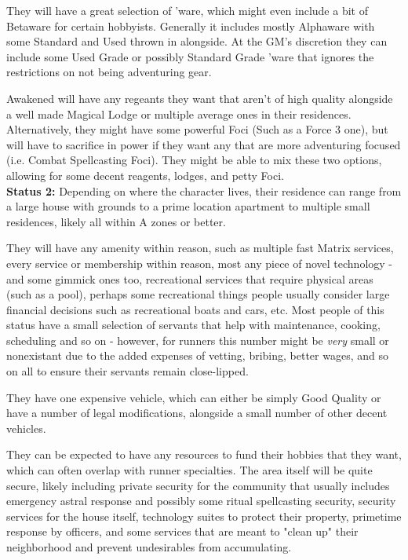 \begin{multicols}{2}
\begin{coloredbox}
	They will have a great selection of 'ware, which might even include a bit of Betaware for certain hobbyists. Generally it includes mostly Alphaware with some Standard and Used thrown in alongside. At the GM's discretion they can include some Used Grade or possibly Standard Grade 'ware that ignores the restrictions on not being adventuring gear.
	
	Awakened will have any regeants they want that aren't of high quality alongside a well made Magical Lodge or multiple average ones in their residences. Alternatively, they might have some powerful Foci (Such as a Force 3 one), but will have to sacrifice in power if they want any that are more adventuring focused (i.e. Combat Spellcasting Foci). They might be able to mix these two options, allowing for some decent reagents, lodges, and petty Foci. \\
	
	\textbf{Status 2:} Depending on where the character lives, their residence can range from a large house with grounds to a prime location apartment to multiple small residences, likely all within A zones or better.
	
	They will have any amenity within reason, such as multiple fast Matrix services, every service or membership within reason, most any piece of novel technology - and some gimmick ones too, recreational services that require physical areas (such as a pool), perhaps some recreational things people usually consider large financial decisions such as recreational boats and cars, etc. Most people of this status have a small selection of servants that help with maintenance, cooking, scheduling and so on - however, for runners this number might be \textit{very} small or nonexistant due to the added expenses of vetting, bribing, better wages, and so on all to ensure their servants remain close-lipped.
	
	They have one expensive vehicle, which can either be simply Good Quality or have a number of legal modifications, alongside a small number of other decent vehicles. 
	
	They can be expected to have any resources to fund their hobbies that they want, which can often overlap with runner specialties. The area itself will be quite secure, likely including private security for the community that usually includes emergency astral response and possibly some ritual spellcasting security, security services for the house itself, technology suites to protect their property, primetime response by officers, and some services that are meant to "clean up" their neighborhood and prevent undesirables from accumulating. 
	

\end{coloredbox}
\end{multicols}
